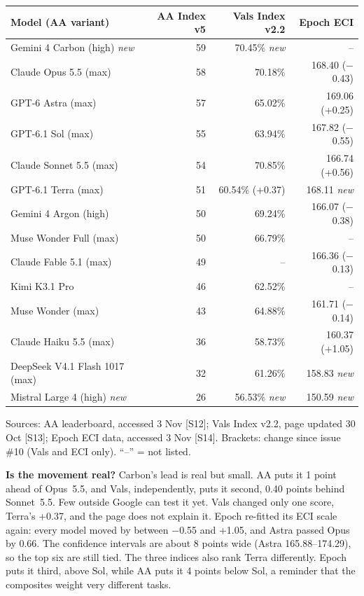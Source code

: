 \documentclass[11pt,a4paper]{article}
\newcommand{\srcref}[1]{\textcolor{brandaccent}{[S#1]}}
\begin{document}
{\small
\begin{tabularx}{\textwidth}{@{}X r r r@{}}
\toprule
\textbf{Model (AA variant)} & \textbf{AA Index v5} & \textbf{Vals Index v2.2} & \textbf{Epoch ECI} \\
\midrule
Gemini 4 Carbon (high) \emph{new}  & 59 & 70.45\% \emph{new} & -- \\
Claude Opus 5.5 (max)              & 58 & 70.18\%            & 168.40 ($-$0.43) \\
GPT-6 Astra (max)                  & 57 & 65.02\%            & 169.06 (+0.25) \\
GPT-6.1 Sol (max)                  & 55 & 63.94\%            & 167.82 ($-$0.55) \\
Claude Sonnet 5.5 (max)            & 54 & 70.85\%            & 166.74 (+0.56) \\
GPT-6.1 Terra (max)                & 51 & 60.54\% (+0.37)    & 168.11 \emph{new} \\
Gemini 4 Argon (high)              & 50 & 69.24\%            & 166.07 ($-$0.38) \\
Muse Wonder Full (max)             & 50 & 66.79\%            & -- \\
Claude Fable 5.1 (max)             & 49 & --                 & 166.36 ($-$0.13) \\
Kimi K3.1 Pro                      & 46 & 62.52\%            & -- \\
Muse Wonder (max)                  & 43 & 64.88\%            & 161.71 ($-$0.14) \\
Claude Haiku 5.5 (max)             & 36 & 58.73\%            & 160.37 (+1.05) \\
DeepSeek V4.1 Flash 1017 (max)     & 32 & 61.26\%            & 158.83 \emph{new} \\
Mistral Large 4 (high) \emph{new}  & 26 & 56.53\% \emph{new} & 150.59 \emph{new} \\
\bottomrule
\end{tabularx}}
\par\vspace{0.2em}
{\footnotesize\color{brandgrey}Sources: AA leaderboard, accessed 3 Nov \srcref{12}; Vals Index v2.2, page updated 30 Oct \srcref{13};
Epoch ECI data, accessed 3 Nov \srcref{14}. Brackets: change since issue \#10 (Vals and ECI only). ``--'' = not listed.}
\vspace{0.3em}

\textbf{Is the movement real?} Carbon's lead is real but small. AA puts it 1 point ahead of Opus~5.5, and Vals, independently, puts it second, 0.40 points behind Sonnet~5.5. Few outside Google can test it yet.
Vals changed only one score, Terra's +0.37, and the page does not explain it. Epoch re-fitted its ECI scale again: every model moved by between $-$0.55 and +1.05, and Astra passed Opus by 0.66. The confidence intervals are about 8 points wide (Astra 165.88--174.29), so the top six are still tied.
The three indices also rank Terra differently. Epoch puts it third, above Sol, while AA puts it 4 points below Sol, a reminder that the composites weight very different tasks.
\end{document}
